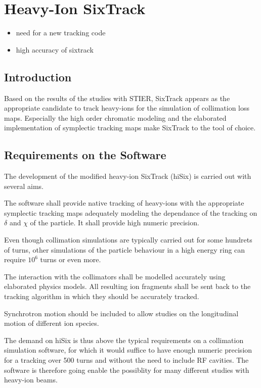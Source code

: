 \chapter{Heavy-Ion SixTrack}

\begin{itemize}
\item need for a new tracking code
\item high accuracy of sixtrack
\end{itemize}


\section*{Introduction}
Based on the results of the studies with STIER, SixTrack appears as the appropriate candidate to track heavy-ions for the simulation of collimation loss maps. Especially the high order chromatic modeling and the elaborated implementation of symplectic tracking maps make SixTrack to the tool of choice. 



\section{Requirements on the Software}

The development of the modified heavy-ion SixTrack (hiSix) is carried out with several aims. 

The software shall provide native tracking of heavy-ions with the appropriate symplectic tracking maps adequately modeling the dependance of the tracking on $\delta $ and $\chi$ of the particle. It shall provide high numeric precision. 

Even though collimation simulations are typically carried out for some hundrets of turns, other simulations of the particle behaviour in a high energy ring can require $10^6$ turns or even more.

The interaction with the collimators shall be modelled accurately using elaborated physics models. All resulting ion fragments shall be sent back to the tracking algorithm in which they should be accurately tracked. 

Synchrotron motion should be included to allow studies on the longitudinal motion of different ion species. 

The demand on hiSix is thus above the typical requirements on a collimation simulation software, for which it would suffice to have enough numeric precision for a tracking over 500 turns and without the need to include RF cavities. The software is therefore going enable the possiblity for many different studies with heavy-ion beams.



